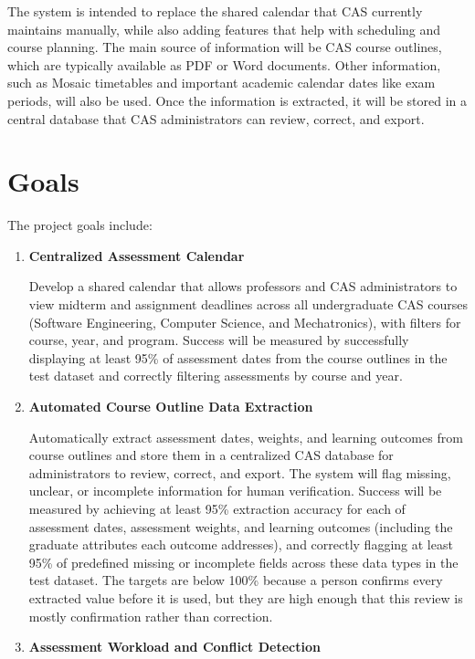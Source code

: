 \documentclass{article}
\begin{document}
\bigskip
The system is intended to replace the shared calendar that CAS currently
maintains manually, while also adding features that help with scheduling and
course planning. The main source of information will be CAS course outlines,
which are typically available as PDF or Word documents. Other information, such
as Mosaic timetables and important academic calendar dates like exam periods,
will also be used. Once the information is extracted, it will be stored in a
central database that CAS administrators can review, correct, and export.


\section{Goals}

The project goals include:
\begin{enumerate}
    \item \textbf{Centralized Assessment Calendar}

    Develop a shared calendar that allows professors and CAS administrators to view midterm and assignment deadlines across all undergraduate CAS courses (Software Engineering, Computer Science, and Mechatronics), with filters for course, year, and program. Success will be measured by successfully displaying at least 95\% of assessment dates from the course outlines in the test dataset and correctly filtering assessments by course and year.

    \item \textbf{Automated Course Outline Data Extraction}

    Automatically extract assessment dates, weights, and learning outcomes from course outlines and store them in a centralized CAS database for administrators to review, correct, and export. The system will flag missing, unclear, or incomplete information for human verification. Success will be measured by achieving at least 95\% extraction accuracy for each of assessment dates, assessment weights, and learning outcomes (including the graduate attributes each outcome addresses), and correctly flagging at least 95\% of predefined missing or incomplete fields across these data types in the test dataset. The targets are below 100\% because a person confirms every extracted value before it is used, but they are high enough that this review is mostly confirmation rather than correction.

    \item \textbf{Assessment Workload and Conflict Detection}


\end{enumerate}
\end{document}
